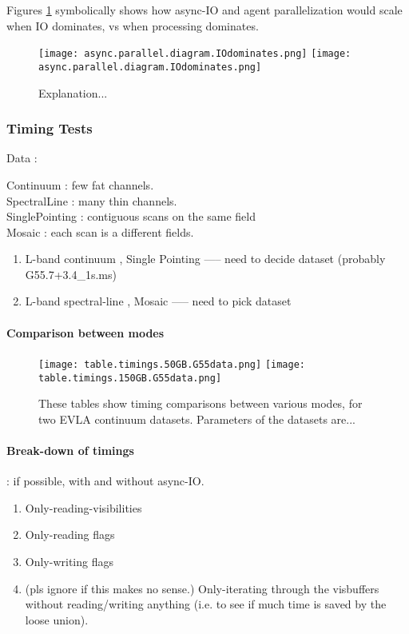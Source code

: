 Figures \ref{Fig:AsyncDiags} symbolically shows how async-IO and agent parallelization would scale
when IO dominates, vs when processing dominates.

\begin{figure}
\texttt{[image: async.parallel.diagram.IOdominates.png]}
\texttt{[image: async.parallel.diagram.IOdominates.png]}
\caption{Explanation...}
\label{Fig:AsyncDiags}
\end{figure}






\subsubsection{Timing Tests}

Data : 

Continuum : few fat channels.\\
SpectralLine : many thin channels.\\

SinglePointing : contiguous scans on the same field\\
Mosaic  :  each scan is a different fields.\\

\begin{enumerate}
\item \label{dA} L-band continuum , Single Pointing   ----- need to decide dataset (probably G55.7+3.4\_1s.ms)
\item \label{dB} L-band spectral-line , Mosaic            ----- need to pick dataset 

\end{enumerate}


\paragraph{Comparison between modes}


\begin{figure}
\texttt{[image: table.timings.50GB.G55data.png]}
\texttt{[image: table.timings.150GB.G55data.png]}
\caption{These tables show timing comparisons between various modes, for two EVLA continuum datasets. Parameters of the datasets are... }
\end{figure}


\paragraph{Break-down of timings} : if possible, with and without async-IO.
\begin{enumerate}
\item  Only-reading-visibilities 
\item  Only-reading flags
\item  Only-writing flags
\item  (pls ignore if this makes no sense.) Only-iterating through the visbuffers without reading/writing anything (i.e. to see if much time is saved by the loose union). 
\end{enumerate}

